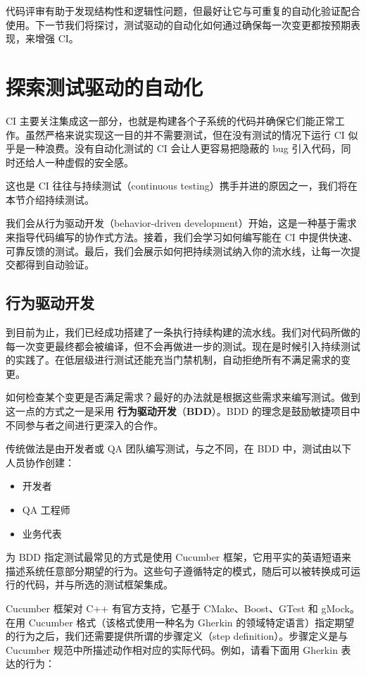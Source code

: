 代码评审有助于发现结构性和逻辑性问题，但最好让它与可重复的自动化验证配合使用。下一节我们将探讨，测试驱动的自动化如何通过确保每一次变更都按预期表现，来增强 CI。

\section{探索测试驱动的自动化}

\label{idx:924}
CI 主要关注集成这一部分，也就是构建各个子系统的代码并确保它们能正常工作。虽然严格来说实现这一目的并不需要测试，但在没有测试的情况下运行 CI 似乎是一种浪费。没有自动化测试的 CI 会让人更容易把隐蔽的 bug 引入代码，同时还给人一种虚假的安全感。

这也是 CI 往往与持续测试（continuous testing）携手并进的原因之一，我们将在本节介绍持续测试。

\label{idx:925}
我们会从行为驱动开发（behavior-driven development）开始，这是一种基于需求来指导代码编写的协作式方法。接着，我们会学习如何编写能在 CI 中提供快速、可靠反馈的测试。最后，我们会展示如何把持续测试纳入你的流水线，让每一次提交都得到自动验证。

\subsection{行为驱动开发}

\label{idx:926}
到目前为止，我们已经成功搭建了一条执行持续构建的流水线。我们对代码所做的每一次变更最终都会被编译，但不会再做进一步的测试。现在是时候引入持续测试的实践了。在低层级进行测试还能充当门禁机制，自动拒绝所有不满足需求的变更。

\label{idx:927}
如何检查某个变更是否满足需求？最好的办法就是根据这些需求来编写测试。做到这一点的方式之一是采用 \textbf{行为驱动开发}（\textbf{BDD}）。BDD 的理念是鼓励敏捷项目中不同参与者之间进行更深入的合作。

传统做法是由开发者或 QA 团队编写测试，与之不同，在 BDD 中，测试由以下人员协作创建：

\begin{itemize}
\item 开发者
\item QA 工程师
\item 业务代表
\end{itemize}

为 BDD 指定测试最常见的方式是使用 Cucumber 框架，它用平实的英语短语来描述系统任意部分期望的行为。这些句子遵循特定的模式，随后可以被转换成可运行的代码，并与所选的测试框架集成。

Cucumber 框架对 C++ 有官方支持，它基于 CMake、Boost、GTest 和 gMock。在用 Cucumber 格式（该格式使用一种名为 Gherkin 的领域特定语言）指定期望的行为之后，我们还需要提供所谓的步骤定义（step definition）。步骤定义是与 Cucumber 规范中所描述动作相对应的实际代码。例如，请看下面用 Gherkin 表达的行为：

